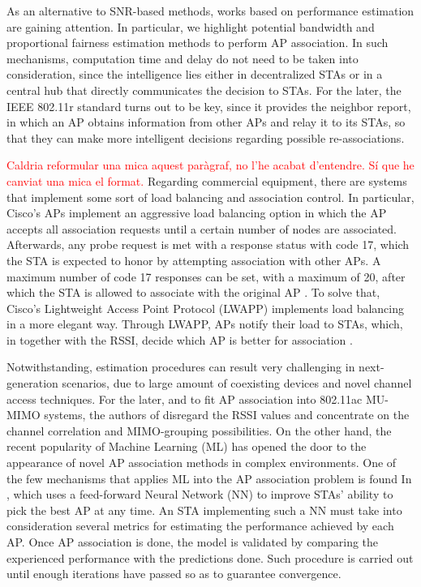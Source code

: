 \documentclass{article}
\begin{document}
	As an alternative to SNR-based methods, works based on performance estimation are gaining attention. In particular, we highlight potential bandwidth \cite{vasudevan2005} and proportional fairness \cite{Li2014, amer2016} estimation methods to perform AP association. In such mechanisms, computation time and delay do not need to be taken into consideration, since the intelligence lies either in decentralized STAs or in a central hub that directly communicates the decision to STAs. For the later, the IEEE 802.11r standard turns out to be key, since it provides the neighbor report, in which an AP obtains information from other APs and relay it to its STAs, so that they can make more intelligent decisions regarding possible re-associations. 
	
	\textcolor{red}{Caldria reformular una mica aquest paràgraf, no l'he acabat d'entendre. Sí que he canviat una mica el format.} Regarding commercial equipment, there are systems that implement some sort of load balancing and association control. In particular, Cisco's APs implement an aggressive load balancing option in which the AP accepts all association requests until a certain number of nodes are associated. Afterwards, any probe request is met with a response status with code 17, which the STA is expected to honor by attempting association with other APs. A maximum number of code 17 responses can be set, with a maximum of 20, after which the STA is allowed to associate with the original AP \cite{cisco2017}. To solve that, Cisco's Lightweight Access Point Protocol (LWAPP) implements load balancing in a more elegant way. Through LWAPP, APs notify their load to STAs, which, in together with the RSSI, decide which AP is better for association \cite{cisco2006}.
	
	Notwithstanding, estimation procedures can result very challenging in next-generation scenarios, due to large amount of coexisting devices and novel channel access techniques. For the later, and to fit AP association into 802.11ac MU-MIMO systems, the authors of \cite{mimo2017} disregard the RSSI values and concentrate on the channel correlation and MIMO-grouping possibilities. On the other hand, the recent popularity of Machine Learning (ML) has opened the door to the appearance of novel AP association methods in complex environments. One of the few mechanisms that applies ML into the AP association problem is found In \cite{bojovic2011}, which uses a feed-forward Neural Network (NN) to improve STAs' ability to pick the best AP at any time. An STA implementing such a NN must take into consideration several metrics for estimating the performance achieved by each AP. Once AP association is done, the model is validated by comparing the experienced performance with the predictions done. Such procedure is carried out until enough iterations have passed so as to guarantee convergence.	
	
\end{document}
